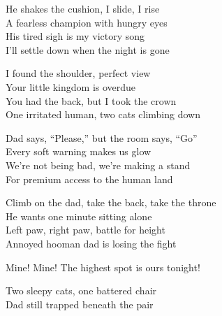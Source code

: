 \begin{lyrics}
He shakes the cushion, I slide, I rise\\
A fearless champion with hungry eyes\\
His tired sigh is my victory song\\
I’ll settle down when the night is gone

I found the shoulder, perfect view\\
Your little kingdom is overdue\\
You had the back, but I took the crown\\
One irritated human, two cats climbing down

Dad says, “Please,” but the room says, “Go”\\
Every soft warning makes us glow\\
We’re not being bad, we’re making a stand\\
For premium access to the human land

Climb on the dad, take the back, take the throne\\
He wants one minute sitting alone\\
Left paw, right paw, battle for height\\
Annoyed hooman dad is losing the fight

 Mine!
 Mine!
 The highest spot is ours tonight!

Two sleepy cats, one battered chair\\
Dad still trapped beneath the pair
\end{lyrics}

